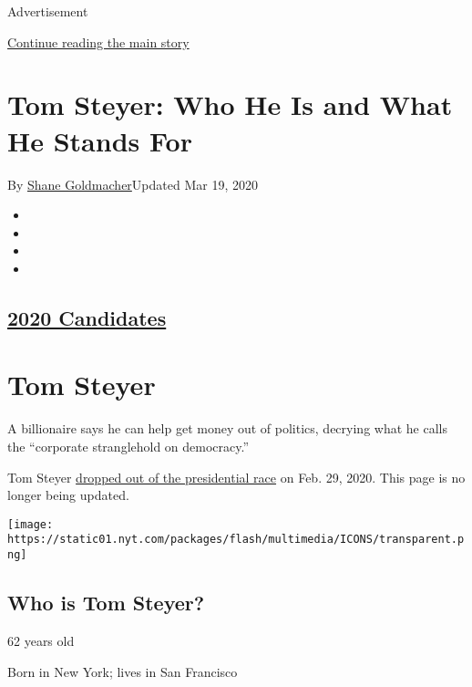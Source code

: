 Advertisement

\protect\hyperlink{after-top}{Continue reading the main story}

\hypertarget{tom-steyer-who-he-is-and-what-he-stands-for}{%
\section{Tom Steyer: Who He Is and What He Stands
For}\label{tom-steyer-who-he-is-and-what-he-stands-for}}

By \href{https://www.nytimes.com/by/shane-goldmacher}{Shane
Goldmacher}Updated Mar 19, 2020

\begin{itemize}
\item
\item
\item
\item
\end{itemize}

\hypertarget{2020-candidates}{%
\subsection{\texorpdfstring{\href{https://www.nytimes.com/interactive/2019/us/politics/2020-presidential-candidates.html}{2020
Candidates}}{2020 Candidates}}\label{2020-candidates}}

\hypertarget{tom-steyer}{%
\section{Tom Steyer}\label{tom-steyer}}

A billionaire says he can help get money out of politics, decrying what
he calls the ``corporate stranglehold on democracy.''

Tom Steyer
\href{https://www.nytimes.com/2020/02/29/us/politics/tom-steyer-drops-out.html}{dropped
out of the presidential race} on Feb. 29, 2020. This page is no longer
being updated.

\texttt{[image: https://static01.nyt.com/packages/flash/multimedia/ICONS/transparent.png]}

\hypertarget{who-is-tom-steyer}{%
\subsection{Who is Tom Steyer?}\label{who-is-tom-steyer}}

62 years old

Born in New York; lives in San Francisco

